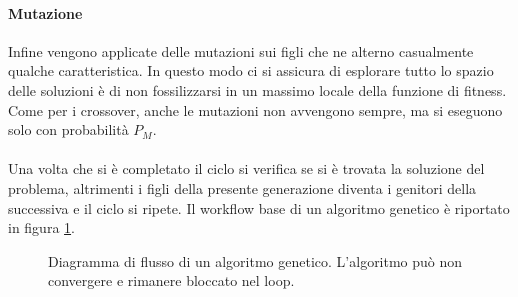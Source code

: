 \documentclass[italian,twoside,twocolumn]{article}
\begin{document}
\paragraph{Mutazione} Infine vengono applicate delle mutazioni sui figli che ne alterno casualmente qualche caratteristica. In questo modo ci si assicura di esplorare tutto lo spazio delle soluzioni è di non fossilizzarsi in un massimo locale della funzione di fitness. Come per i crossover, anche le mutazioni non avvengono sempre, ma si eseguono solo con probabilità $ P_M $.
\\ \\
Una volta che si è completato il ciclo si verifica se si è trovata la soluzione del problema, altrimenti i figli della presente generazione diventa i genitori della successiva e il ciclo si ripete. Il workflow base di un algoritmo genetico è riportato in figura \ref*{fig:workflow_genetic}. 
\begin{figure}[htbp]
	\centering
	\caption{Diagramma di flusso di un algoritmo genetico. L'algoritmo può non convergere e rimanere bloccato nel loop. }
	\label{fig:workflow_genetic}
\end{figure}
\end{document}
